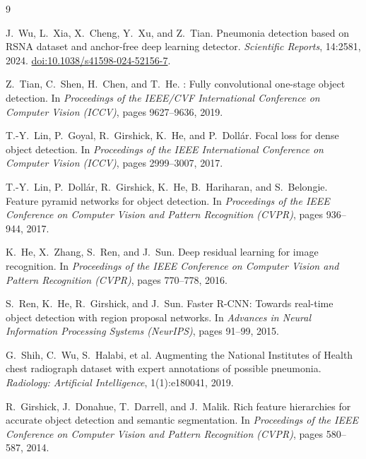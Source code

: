 \documentclass[11pt,a4paper]{article}
\providecommand{\doi}[1]{\href{https://doi.org/#1}{doi:#1}}
\begin{document}
\small
\setlength{\bibsep}{2pt plus 1pt}
\begin{thebibliography}{9}

J.~Wu, L.~Xia, X.~Cheng, Y.~Xu, and Z.~Tian.
\newblock Pneumonia detection based on {RSNA} dataset and anchor-free deep learning detector.
\newblock \emph{Scientific Reports}, 14:2581, 2024.
\newblock \doi{10.1038/s41598-024-52156-7}.

Z.~Tian, C.~Shen, H.~Chen, and T.~He.
: Fully convolutional one-stage object detection.
\newblock In \emph{Proceedings of the IEEE/CVF International Conference on Computer Vision (ICCV)}, pages 9627--9636, 2019.

T.-Y.~Lin, P.~Goyal, R.~Girshick, K.~He, and P.~Doll\'{a}r.
\newblock Focal loss for dense object detection.
\newblock In \emph{Proceedings of the IEEE International Conference on Computer Vision (ICCV)}, pages 2999--3007, 2017.

T.-Y.~Lin, P.~Doll\'{a}r, R.~Girshick, K.~He, B.~Hariharan, and S.~Belongie.
\newblock Feature pyramid networks for object detection.
\newblock In \emph{Proceedings of the IEEE Conference on Computer Vision and Pattern Recognition (CVPR)}, pages 936--944, 2017.

K.~He, X.~Zhang, S.~Ren, and J.~Sun.
\newblock Deep residual learning for image recognition.
\newblock In \emph{Proceedings of the IEEE Conference on Computer Vision and Pattern Recognition (CVPR)}, pages 770--778, 2016.

S.~Ren, K.~He, R.~Girshick, and J.~Sun.
\newblock Faster {R-CNN}: Towards real-time object detection with region proposal networks.
\newblock In \emph{Advances in Neural Information Processing Systems (NeurIPS)}, pages 91--99, 2015.

G.~Shih, C.~Wu, S.~Halabi, et al.
\newblock Augmenting the {N}ational {I}nstitutes of {H}ealth chest radiograph dataset with expert annotations of possible pneumonia.
\newblock \emph{Radiology: Artificial Intelligence}, 1(1):e180041, 2019.

R.~Girshick, J.~Donahue, T.~Darrell, and J.~Malik.
\newblock Rich feature hierarchies for accurate object detection and semantic segmentation.
\newblock In \emph{Proceedings of the IEEE Conference on Computer Vision and Pattern Recognition (CVPR)}, pages 580--587, 2014.


\end{thebibliography}
\end{document}
